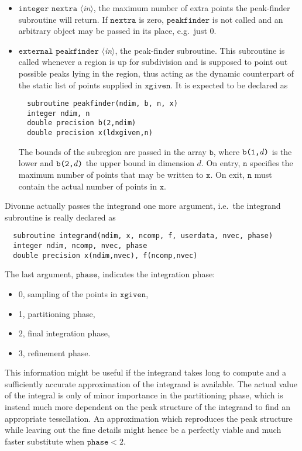 \documentclass[12pt]{article}
\newcommand\ie{i.e.\ }
\newcommand\eg{e.g.\ }
\newcommand\Code[1]{\ensuremath{\texttt{#1}}}
\newcommand\Var[1]{\ensuremath{\mathit{#1}}}
\newcommand\VarIn[1]{\item\Code{#1} \textit{$\langle$in\/$\rangle$},}
\begin{document}
\begin{itemize}
\VarIn{integer nextra}
the maximum number of extra points the peak-finder subroutine will
return.  If \Code{nextra} is zero, \Code{peakfinder} is not called
and an arbitrary object may be passed in its place, \eg just 0.

\VarIn{external peakfinder}
the peak-finder subroutine.  This subroutine is called whenever a region 
is up for subdivision and is supposed to point out possible peaks lying 
in the region, thus acting as the dynamic counterpart of the static list 
of points supplied in \Code{xgiven}.  It is expected to be declared as
\begin{verbatim}
  subroutine peakfinder(ndim, b, n, x)
  integer ndim, n
  double precision b(2,ndim)
  double precision x(ldxgiven,n)
\end{verbatim}
The bounds of the subregion are passed in the array \Code{b}, where 
\Code{b(1,\Var{d})} is the lower and \Code{b(2,\Var{d})} the upper 
bound in dimension \Var{d}.  On entry, \Code{n} specifies the maximum 
number of points that may be written to \Code{x}.  On exit, \Code{n} 
must contain the actual number of points in \Code{x}.
\end{itemize}
Divonne actually passes the integrand one more argument, \ie the 
integrand subroutine is really declared as
\begin{verbatim}
  subroutine integrand(ndim, x, ncomp, f, userdata, nvec, phase)
  integer ndim, ncomp, nvec, phase
  double precision x(ndim,nvec), f(ncomp,nvec)
\end{verbatim}
The last argument, \Code{phase}, indicates the integration phase:
\begin{itemize}
\item 0, sampling of the points in \Code{xgiven},
\item 1, partitioning phase,
\item 2, final integration phase,
\item 3, refinement phase.
\end{itemize}
This information might be useful if the integrand takes long to compute
and a sufficiently accurate approximation of the integrand is available. 
The actual value of the integral is only of minor importance in the
partitioning phase, which is instead much more dependent on the peak
structure of the integrand to find an appropriate tessellation.  An
approximation which reproduces the peak structure while leaving out the
fine details might hence be a perfectly viable and much faster
substitute when $\Code{phase} < 2$.
\end{document}
